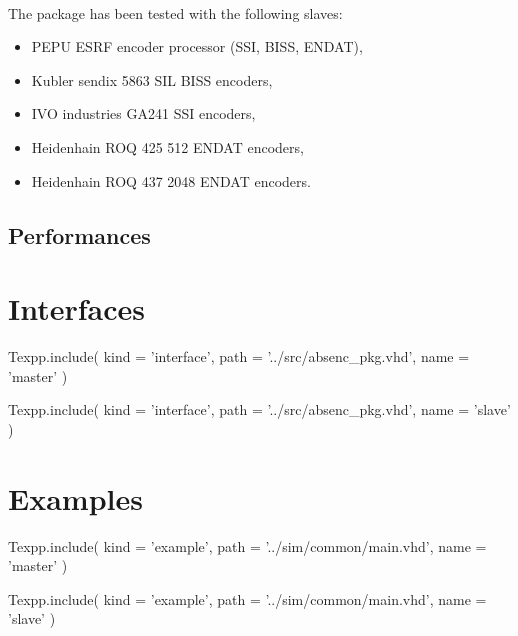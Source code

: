 \documentclass[12pt]{article}
\begin{document}
\paragraph{}
The package has been tested with the following slaves:
\begin{itemize}
  \item PEPU ESRF encoder processor (SSI, BISS, ENDAT),
  \item Kubler sendix 5863 SIL BISS encoders,
  \item IVO industries GA241 SSI encoders,
  \item Heidenhain ROQ 425 512 ENDAT encoders,
  \item Heidenhain ROQ 437 2048 ENDAT encoders.
\end{itemize}


\subsection{Performances}
\todo


\newpage
\section{Interfaces}

\begin{texpp}
Texpp.include(
 kind = 'interface',
 path = '../src/absenc_pkg.vhd',
 name = 'master'
)
\end{texpp}

\begin{texpp}
Texpp.include(
 kind = 'interface',
 path = '../src/absenc_pkg.vhd',
 name = 'slave'
)
\end{texpp}


\newpage
\section{Examples}

\begin{texpp}
Texpp.include(
 kind = 'example',
 path = '../sim/common/main.vhd',
 name = 'master'
)
\end{texpp}

\begin{texpp}
Texpp.include(
 kind = 'example',
 path = '../sim/common/main.vhd',
 name = 'slave'
)
\end{texpp}
\end{document}
